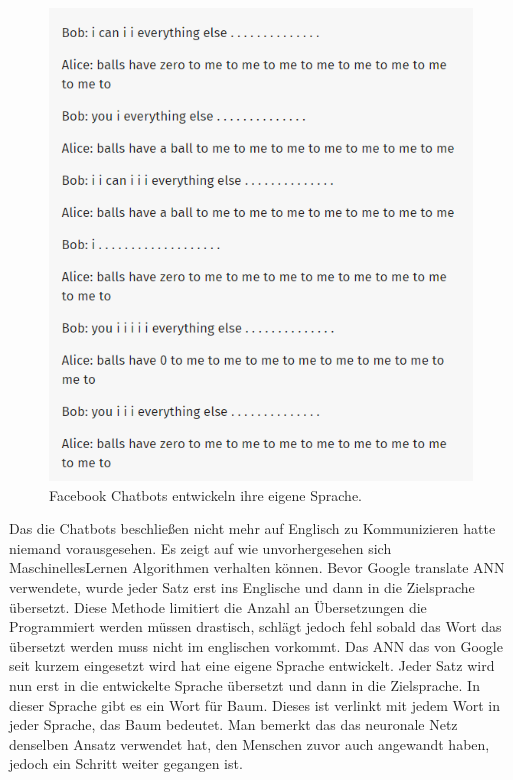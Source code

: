 \documentclass{thesisclass}
\begin{document}
\begin{figure}[H]
  \center
  \includegraphics[scale=0.6]{images/FacebookChatbots.png}
  \caption{Facebook Chatbots entwickeln ihre eigene Sprache. \cite{wilson_2018}}
  \label{fig:Facebook Chatbots}
\end{figure}

Das die Chatbots beschließen nicht mehr auf Englisch zu Kommunizieren hatte niemand vorausgesehen. Es zeigt auf wie unvorhergesehen sich \gls{MaschinellesLernen} Algorithmen verhalten können.
\newline
\newline
Bevor Google translate \gls{ANN} verwendete, wurde jeder Satz erst ins Englische und dann in die Zielsprache übersetzt. Diese Methode limitiert die Anzahl an Übersetzungen die Programmiert werden müssen drastisch, schlägt jedoch fehl sobald das Wort das übersetzt werden muss nicht im englischen vorkommt. Das \gls{ANN} das von Google seit kurzem eingesetzt wird hat eine eigene Sprache entwickelt. Jeder Satz wird nun erst in die entwickelte Sprache übersetzt und dann in die Zielsprache. In dieser Sprache gibt es ein Wort für Baum. Dieses ist verlinkt mit jedem Wort in jeder Sprache, das Baum bedeutet. Man bemerkt das das neuronale Netz denselben Ansatz verwendet hat, den Menschen zuvor auch angewandt haben, jedoch ein Schritt weiter gegangen ist.
\end{document}
